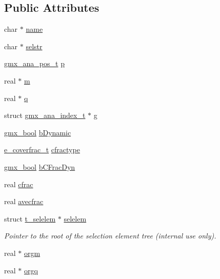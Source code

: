\subsection*{\-Public \-Attributes}
\begin{DoxyCompactItemize}
\item 
char $\ast$ \hyperlink{structgmx__ana__selection__t_ad91f87c41782ba9ab6bfba8fca6b302b}{name}
\item 
char $\ast$ \hyperlink{structgmx__ana__selection__t_a32be3edd9d2953ce5991391a5a5b6f67}{selstr}
\item 
\hyperlink{structgmx__ana__pos__t}{gmx\-\_\-ana\-\_\-pos\-\_\-t} \hyperlink{structgmx__ana__selection__t_a47df2484de4409ea55854a73596fd473}{p}
\item 
real $\ast$ \hyperlink{structgmx__ana__selection__t_adc77a2a849982e2494cbc3fa395ea75c}{m}
\item 
real $\ast$ \hyperlink{structgmx__ana__selection__t_a064c4869a30cd4a765c4a9e070649997}{q}
\item 
struct \hyperlink{structgmx__ana__index__t}{gmx\-\_\-ana\-\_\-index\-\_\-t} $\ast$ \hyperlink{structgmx__ana__selection__t_a20390f0b950e6be7bc2cde12d128f8f1}{g}
\item 
\hyperlink{include_2types_2simple_8h_a8fddad319f226e856400d190198d5151}{gmx\-\_\-bool} \hyperlink{structgmx__ana__selection__t_a47ef4b94fe3d429e271b9adcbe57f08f}{b\-Dynamic}
\item 
\hyperlink{include_2selection_8h_a3586467b9eaf1c08160c5fef7377e622}{e\-\_\-coverfrac\-\_\-t} \hyperlink{structgmx__ana__selection__t_acef74bfc8e4ad3d45f9ed1607acb5837}{cfractype}
\item 
\hyperlink{include_2types_2simple_8h_a8fddad319f226e856400d190198d5151}{gmx\-\_\-bool} \hyperlink{structgmx__ana__selection__t_aa247904e9b522f1effaaf11e7a95f0c8}{b\-C\-Frac\-Dyn}
\item 
real \hyperlink{structgmx__ana__selection__t_a84b162a293c1e7b32636e972bc7e4a95}{cfrac}
\item 
real \hyperlink{structgmx__ana__selection__t_a4145e1e222e45997d9e5d2e6c451e606}{avecfrac}
\item 
struct \hyperlink{structt__selelem}{t\-\_\-selelem} $\ast$ \hyperlink{structgmx__ana__selection__t_a267fe62fbf8482460cd1797972fdd5f2}{selelem}
\begin{DoxyCompactList}\small\item\em \-Pointer to the root of the selection element tree (internal use only). \end{DoxyCompactList}\item 
real $\ast$ \hyperlink{structgmx__ana__selection__t_a16054b99f1ace8cc67e7edb83f4fe9d2}{orgm}
\item 
real $\ast$ \hyperlink{structgmx__ana__selection__t_aaa176888e5c42159df882ef4653c0bea}{orgq}
\end{DoxyCompactItemize}


